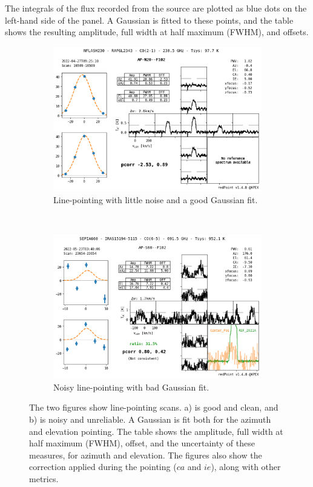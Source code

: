 The integrals of the flux recorded from the source are plotted as blue dots on the left-hand side of the panel.
A Gaussian is fitted to these points, and the table shows the resulting amplitude, full width at half maximum (FWHM), and offsets.

\begin{figure}[H]
    \centering
     \begin{subfigure}[b]{0.75\textwidth}
         \centering
         \includegraphics[width=\textwidth]{Pointing Scans/good_line.png}
         \caption{Line-pointing with little noise and a good Gaussian fit.}
         \label{subfig:good_line}
     \end{subfigure}
    \\
     \begin{subfigure}[b]{0.75\textwidth}
         \centering
         \includegraphics[width=\textwidth]{Pointing Scans/bad_line.png}
         \caption{Noisy line-pointing with bad Gaussian fit.}
         \label{subfig:bad_line}
     \end{subfigure}
    \caption[Line pointing panel]{The two figures show line-pointing scans. a) is good and clean, and b) is noisy and unreliable. A Gaussian is fit both for the azimuth and elevation pointing.
    The table shows the amplitude, full width at half maximum (FWHM), offset, and the uncertainty of these measures, for azimuth and elevation.
    The figures also show the correction applied during the pointing ($ca$ and $ie$), along with other metrics.}
    \label{fig:line_pointings}
\end{figure}

